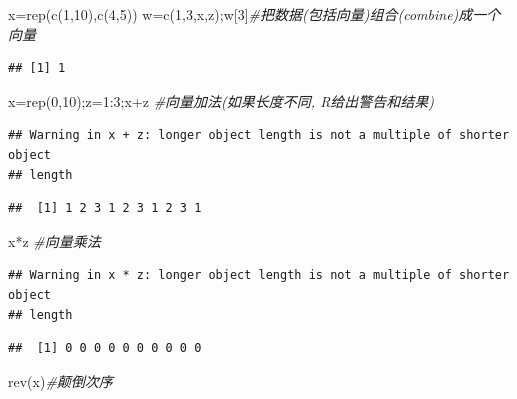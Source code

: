 \documentclass[
]{book}
\newenvironment{Shaded}{\begin{snugshade}}{\end{snugshade}}
\newcommand{\CommentTok}[1]{\textcolor[rgb]{0.56,0.35,0.01}{\textit{#1}}}
\newcommand{\DecValTok}[1]{\textcolor[rgb]{0.00,0.00,0.81}{#1}}
\newcommand{\FunctionTok}[1]{\textcolor[rgb]{0.00,0.00,0.00}{#1}}
\newcommand{\NormalTok}[1]{#1}
\newcommand{\OtherTok}[1]{\textcolor[rgb]{0.56,0.35,0.01}{#1}}
\newcommand{\SpecialCharTok}[1]{\textcolor[rgb]{0.00,0.00,0.00}{#1}}
\begin{document}
\begin{Shaded}
\begin{Highlighting}[]
\NormalTok{x}\OtherTok{=}\FunctionTok{rep}\NormalTok{(}\FunctionTok{c}\NormalTok{(}\DecValTok{1}\NormalTok{,}\DecValTok{10}\NormalTok{),}\FunctionTok{c}\NormalTok{(}\DecValTok{4}\NormalTok{,}\DecValTok{5}\NormalTok{))}
\NormalTok{w}\OtherTok{=}\FunctionTok{c}\NormalTok{(}\DecValTok{1}\NormalTok{,}\DecValTok{3}\NormalTok{,x,z);w[}\DecValTok{3}\NormalTok{]}\CommentTok{\#把数据(包括向量)组合(combine)成一个向量}
\end{Highlighting}
\end{Shaded}

\begin{verbatim}
## [1] 1
\end{verbatim}

\begin{Shaded}
\begin{Highlighting}[]
\NormalTok{x}\OtherTok{=}\FunctionTok{rep}\NormalTok{(}\DecValTok{0}\NormalTok{,}\DecValTok{10}\NormalTok{);z}\OtherTok{=}\DecValTok{1}\SpecialCharTok{:}\DecValTok{3}\NormalTok{;x}\SpecialCharTok{+}\NormalTok{z }\CommentTok{\#向量加法(如果长度不同, R给出警告和结果)}
\end{Highlighting}
\end{Shaded}

\begin{verbatim}
## Warning in x + z: longer object length is not a multiple of shorter object
## length
\end{verbatim}

\begin{verbatim}
##  [1] 1 2 3 1 2 3 1 2 3 1
\end{verbatim}

\begin{Shaded}
\begin{Highlighting}[]
\NormalTok{x}\SpecialCharTok{*}\NormalTok{z   }\CommentTok{\#向量乘法}
\end{Highlighting}
\end{Shaded}

\begin{verbatim}
## Warning in x * z: longer object length is not a multiple of shorter object
## length
\end{verbatim}

\begin{verbatim}
##  [1] 0 0 0 0 0 0 0 0 0 0
\end{verbatim}

\begin{Shaded}
\begin{Highlighting}[]
\FunctionTok{rev}\NormalTok{(x)}\CommentTok{\#颠倒次序}
\end{Highlighting}
\end{Shaded}
\end{document}
